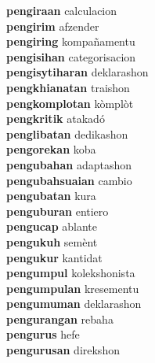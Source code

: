 \textbf{pengiraan } calculacion \\
\textbf{pengirim } afzender \\
\textbf{pengiring } kompañamentu \\
\textbf{pengisihan } categorisacion \\
\textbf{pengisytiharan } deklarashon \\
\textbf{pengkhianatan } traishon \\
\textbf{pengkomplotan } kòmplòt \\
\textbf{pengkritik } atakadó \\
\textbf{penglibatan } dedikashon \\
\textbf{pengorekan } koba \\
\textbf{pengubahan } adaptashon \\
\textbf{pengubahsuaian } cambio \\
\textbf{pengubatan } kura \\
\textbf{penguburan } entiero \\
\textbf{pengucap } ablante \\
\textbf{pengukuh } semènt \\
\textbf{pengukur } kantidat \\
\textbf{pengumpul } kolekshonista \\
\textbf{pengumpulan } kresementu \\
\textbf{pengumuman } deklarashon \\
\textbf{pengurangan } rebaha \\
\textbf{pengurus } hefe \\
\textbf{pengurusan } direkshon \\
